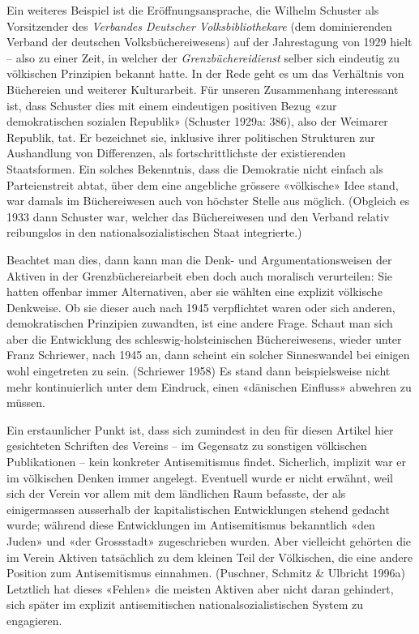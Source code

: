 \documentclass[a4paper,
fontsize=11pt,
oneside,
numbers=noperiodatend,
parskip=half-,
bibliography=totoc,
final
]{scrartcl}
\begin{document}
Ein weiteres Beispiel ist die Eröffnungsansprache, die Wilhelm Schuster
als Vorsitzender des \emph{Verbandes Deutscher Volksbibliothekare} (dem
dominierenden Verband der deutschen Volksbüchereiwesens) auf der
Jahrestagung von 1929 hielt -- also zu einer Zeit, in welcher der
\emph{Grenzbüchereidienst} selber sich eindeutig zu völkischen
Prinzipien bekannt hatte. In der Rede geht es um das Verhältnis von
Büchereien und weiterer Kulturarbeit. Für unseren Zusammenhang
interessant ist, dass Schuster dies mit einem eindeutigen positiven
Bezug «zur demokratischen sozialen Republik» (Schuster 1929a: 386), also
der Weimarer Republik, tat. Er bezeichnet sie, inklusive ihrer
politischen Strukturen zur Aushandlung von Differenzen, als
fortschrittlichste der existierenden Staatsformen. Ein solches
Bekenntnis, dass die Demokratie nicht einfach als Parteienstreit abtat,
über dem eine angebliche grössere «völkische» Idee stand, war damals im
Büchereiwesen auch von höchster Stelle aus möglich. (Obgleich es 1933
dann Schuster war, welcher das Büchereiwesen und den Verband relativ
reibungslos in den nationalsozialistischen Staat integrierte.)

Beachtet man dies, dann kann man die Denk- und Argumentationsweisen der
Aktiven in der Grenzbüchereiarbeit eben doch auch moralisch verurteilen:
Sie hatten offenbar immer Alternativen, aber sie wählten eine explizit
völkische Denkweise. Ob sie dieser auch nach 1945 verpflichtet waren
oder sich anderen, demokratischen Prinzipien zuwandten, ist eine andere
Frage. Schaut man sich aber die Entwicklung des schleswig-holsteinischen
Büchereiwesens, wieder unter Franz Schriewer, nach 1945 an, dann scheint
ein solcher Sinneswandel bei einigen wohl eingetreten zu sein.
(Schriewer 1958) Es stand dann beispielsweise nicht mehr kontinuierlich
unter dem Eindruck, einen «dänischen Einfluss» abwehren zu müssen.

Ein erstaunlicher Punkt ist, dass sich zumindest in den für diesen
Artikel hier gesichteten Schriften des Vereins -- im Gegensatz zu
sonstigen völkischen Publikationen -- kein konkreter Antisemitismus
findet. Sicherlich, implizit war er im völkischen Denken immer angelegt.
Eventuell wurde er nicht erwähnt, weil sich der Verein vor allem mit dem
ländlichen Raum befasste, der als einigermassen ausserhalb der
kapitalistischen Entwicklungen stehend gedacht wurde; während diese
Entwicklungen im Antisemitismus bekanntlich «den Juden» und «der
Grossstadt» zugeschrieben wurden. Aber vielleicht gehörten die im Verein
Aktiven tatsächlich zu dem kleinen Teil der Völkischen, die eine andere
Position zum Antisemitismus einnahmen. (Puschner, Schmitz \& Ulbricht
1996a) Letztlich hat dieses «Fehlen» die meisten Aktiven aber nicht
daran gehindert, sich später im explizit antisemitischen
nationalsozialistischen System zu engagieren.
\end{document}
